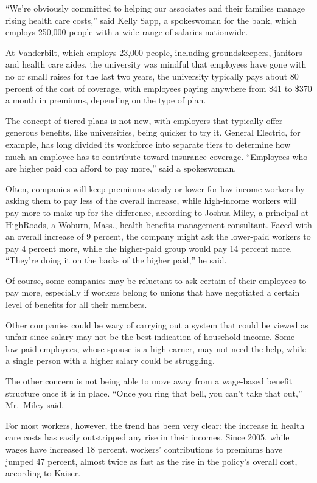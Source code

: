 ﻿\documentclass[12pt]{article}
\begin{document}
``We're obviously committed to helping our associates and their families manage rising health care
costs,'' said Kelly Sapp, a spokeswoman for the bank, which employs 250,000 people with a wide range
of salaries nationwide.

At Vanderbilt, which employs 23,000 people, including groundskeepers, janitors and health care
aides, the university was mindful that employees have gone with no or small raises for the last two
years, the university typically pays about 80 percent of the cost of coverage, with employees paying
anywhere from \$41 to \$370 a month in premiums, depending on the type of plan.

The concept of tiered plans is not new, with employers that typically offer generous benefits, like
universities, being quicker to try it. General Electric, for example, has long divided its workforce
into separate tiers to determine how much an employee has to contribute toward insurance coverage.
``Employees who are higher paid can afford to pay more,'' said a spokeswoman.

Often, companies will keep premiums steady or lower for low-income workers by asking them to pay
less of the overall increase, while high-income workers will pay more to make up for the difference,
according to Joshua Miley, a principal at HighRoads, a Woburn, Mass., health benefits management
consultant. Faced with an overall increase of 9 percent, the company might ask the lower-paid
workers to pay 4 percent more, while the higher-paid group would pay 14 percent more. ``They're
doing it on the backs of the higher paid,'' he said.

Of course, some companies may be reluctant to ask certain of their employees to pay more, especially
if workers belong to unions that have negotiated a certain level of benefits for all their members.

Other companies could be wary of carrying out a system that could be viewed as unfair since salary
may not be the best indication of household income. Some low-paid employees, whose spouse is a high
earner, may not need the help, while a single person with a higher salary could be struggling.

The other concern is not being able to move away from a wage-based benefit structure once it is in
place. ``Once you ring that bell, you can't take that out,'' Mr.~Miley said.

For most workers, however, the trend has been very clear: the increase in health care costs has
easily outstripped any rise in their incomes. Since 2005, while wages have increased 18 percent,
workers' contributions to premiums have jumped 47 percent, almost twice as fast as the rise in the
policy's overall cost, according to Kaiser.
\end{document}
